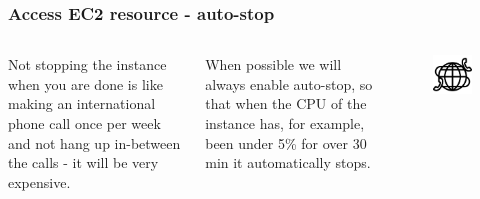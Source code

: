 \documentclass[aspectratio=169]{beamer} %
\begin{document}
\begin{frame}
	\frametitle{Access EC2 resource - auto-stop}

	\begin{columns}[c]
		
		
		Not stopping the instance when you are done is like making an international phone call once per week and not hang up in-between the calls - it will be very expensive.
		
		\vspace{.5cm}
		
		When possible we will always enable auto-stop, so that when the CPU of the instance has, for example, been under 5\% for over 30 min it automatically stops.

		
		\begin{figure}
			\centering
			\includegraphics[width=\textwidth]{./img/international-call.png}
		\end{figure}
	
	\end{columns}
\end{frame}
\end{document}
